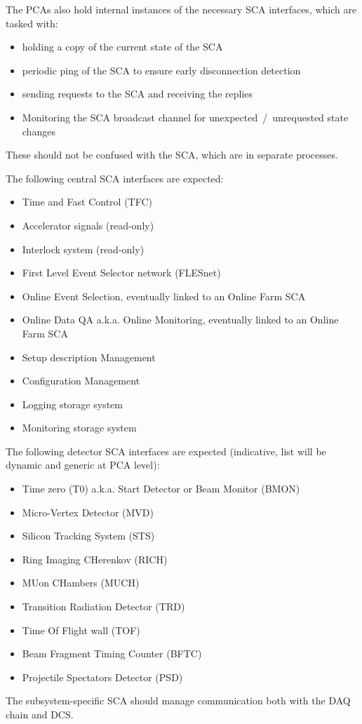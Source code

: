 The PCAs also hold internal instances of the necessary SCA interfaces, which are tasked with:
\begin{itemize}
 \item holding a copy of the current state of the SCA
 \item periodic ping of the SCA to ensure early disconnection detection
 \item sending requests to the SCA and receiving the replies
 \item Monitoring the SCA broadcast channel for unexpected~/~unrequested state changes
\end{itemize}
These should not be confused with the SCA, which are in separate processes.

The following central SCA interfaces are expected:
\begin{itemize}
 \item Time and Fast Control (TFC)
 \item Accelerator signals (read-only)
 \item Interlock system (read-only)
 \item First Level Event Selector network (FLESnet)
 \item Online Event Selection, eventually linked to an Online Farm SCA
 \item Online Data QA a.k.a. Online Monitoring, eventually linked to an Online Farm SCA
 \item Setup description Management
 \item Configuration Management
 \item Logging storage system
 \item Monitoring storage system
\end{itemize}
The following detector SCA interfaces are expected (indicative, list will be dynamic and generic at PCA level):
\begin{itemize}
 \item Time zero (T0) a.k.a. Start Detector or Beam Monitor (BMON)
 \item Micro-Vertex Detector (MVD)
 \item Silicon Tracking System (STS)
 \item Ring Imaging CHerenkov (RICH)
 \item MUon CHambers (MUCH)
 \item Transition Radiation Detector (TRD)
 \item Time Of Flight wall (TOF)
 \item Beam Fragment Timing Counter (BFTC)
 \item Projectile Spectators Detector (PSD)
\end{itemize}
The subsystem-specific SCA should manage communication both with the DAQ chain and DCS. 
